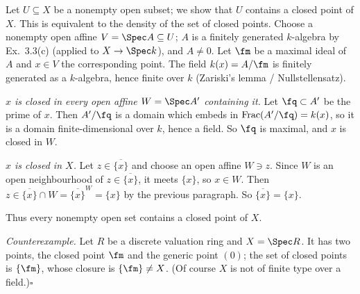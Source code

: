 \documentclass[11pt]{article}
\begin{document}
\pf
Let $U\subseteq X$ be a nonempty open subset; we show that $U$ contains a closed point of $X$. This is equivalent to the density of the set of closed points. Choose a nonempty open affine $V=\Spec A\subseteq U$; $A$ is a finitely generated $k$-algebra by Ex.~3.3(c) (applied to $X\to\Spec k$), and $A\ne0$. Let $\fm$ be a maximal ideal of $A$ and $x\in V$ the corresponding point. The field $k(x)=A/\fm$ is finitely generated as a $k$-algebra, hence finite over $k$ (Zariski's lemma / Nullstellensatz).

\emph{$x$ is closed in every open affine $W=\Spec A'$ containing it.} Let $\fq\subset A'$ be the prime of $x$. Then $A'/\fq$ is a domain which embeds in $\operatorname{Frac}(A'/\fq)=k(x)$, so it is a domain finite-dimensional over $k$, hence a field. So $\fq$ is maximal, and $x$ is closed in $W$.

\emph{$x$ is closed in $X$.} Let $z\in\overline{\{x\}}$ and choose an open affine $W\ni z$. Since $W$ is an open neighbourhood of $z\in\overline{\{x\}}$, it meets $\{x\}$, so $x\in W$. Then $z\in\overline{\{x\}}\cap W=\overline{\{x\}}^W=\{x\}$ by the previous paragraph. So $\overline{\{x\}}=\{x\}$.

Thus every nonempty open set contains a closed point of $X$.

\emph{Counterexample.} Let $R$ be a discrete valuation ring and $X=\Spec R$. It has two points, the closed point $\fm$ and the generic point $(0)$; the set of closed points is $\{\fm\}$, whose closure is $\{\fm\}\ne X$. (Of course $X$ is not of finite type over a field.)\hfill$\square$
\end{document}
